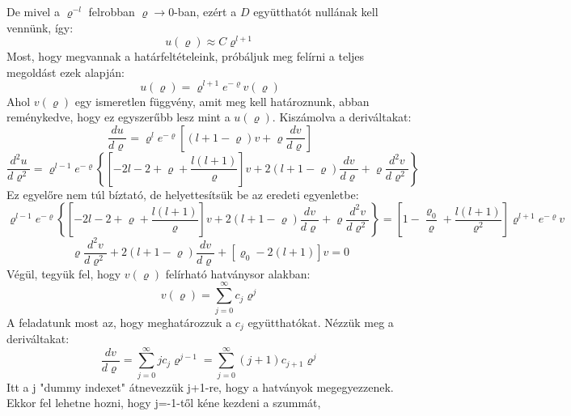 \documentclass[a4paper,12pt]{article}
\begin{document}
De mivel a $\varrho^{-l}$ felrobban $\varrho \to 0$-ban, ezért a $D$ együtthatót nullának kell vennünk, így:
\begin{equation}
    u(\varrho) \approx C \varrho^{l + 1}
\end{equation}
Most, hogy megvannak a határfeltételeink, próbáljuk meg felírni a teljes megoldást ezek alapján:
\begin{equation}
    u(\varrho) = \varrho^{l + 1} e^{-\varrho} v(\varrho)
\end{equation}
Ahol $v(\varrho)$ egy ismeretlen függvény, amit meg kell határoznunk, abban reménykedve, hogy ez egyszerűbb lesz mint a $u(\varrho)$. Kiszámolva a deriváltakat:
\begin{equation}
   \frac{du}{d \varrho} = \varrho^{l} e^{-\varrho} \left[(l + 1 - \varrho)v + \varrho \frac{dv}{d \varrho}\right]
\end{equation}
\begin{equation}
   \frac{d^2 u}{d \varrho^2} = \varrho^{l - 1} e^{-\varrho} \left\{\left[-2l - 2 + \varrho + \frac{l(l+1)}{\varrho}\right]v + 2(l + 1 - \varrho) \frac{dv}{d \varrho} + \varrho \frac{d^2 v}{d \varrho^2}\right\}
\end{equation}
Ez egyelőre nem túl bíztató, de helyettesítsük be az eredeti egyenletbe:
\begin{equation}
    \varrho^{l - 1} e^{-\varrho} \left\{\left[-2l - 2 + \varrho + \frac{l(l+1)}{\varrho}\right]v + 2(l + 1 - \varrho) \frac{dv}{d \varrho} + \varrho \frac{d^2 v}{d \varrho^2}\right\} = \left[1 - \frac{\varrho_0}{\varrho} + \frac{l(l + 1)}{\varrho^2}\right] \varrho^{l + 1} e^{-\varrho} v
\end{equation}
\begin{equation}
   \varrho \frac{d^2 v}{d \varrho^2} + 2(l + 1 - \varrho) \frac{dv}{d \varrho} + [\varrho_0 - 2(l + 1)] v = 0
\end{equation}
Végül, tegyük fel, hogy $v(\varrho)$ felírható hatványsor alakban:
\begin{equation}
    v(\varrho) = \sum_{j=0}^{\infty} c_j \varrho^j
\end{equation}
A feladatunk most az, hogy meghatározzuk a $c_j$ együtthatókat. Nézzük meg a deriváltakat:
\begin{equation}
   \frac{dv}{d \varrho} = \sum_{j=0}^{\infty} j c_j \varrho^{j - 1} = \sum_{j=0}^{\infty} (j + 1) c_{j + 1} \varrho^{j}
\end{equation}
Itt a j "dummy indexet" átnevezzük j+1-re, hogy a hatványok megegyezzenek. Ekkor fel lehetne hozni, hogy j=-1-től kéne kezdeni a szummát,
\end{document}
